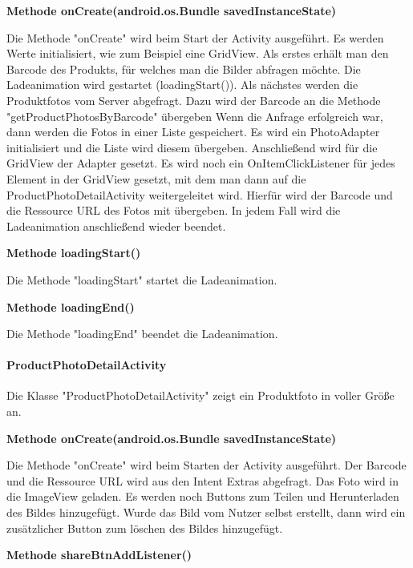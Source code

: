 \documentclass{scrartcl}
\begin{document}
\noindent\textbf{Methode onCreate(android.os.Bundle savedInstanceState)}

\noindent Die Methode "onCreate" wird beim Start der Activity ausgeführt. Es werden Werte initialisiert, wie zum Beispiel eine GridView. Als erstes erhält man den Barcode des Produkts, für welches man die Bilder abfragen möchte. Die Ladeanimation wird gestartet (loadingStart()). Als nächstes werden die Produktfotos vom Server abgefragt. Dazu wird der Barcode an die Methode "getProductPhotosByBarcode" übergeben Wenn die Anfrage erfolgreich war, dann werden die Fotos in einer Liste gespeichert. Es wird ein PhotoAdapter initialisiert und die Liste wird diesem übergeben. Anschließend wird für die GridView der Adapter gesetzt. Es wird noch ein OnItemClickListener für jedes Element in der GridView gesetzt, mit dem man dann auf die ProductPhotoDetailActivity weitergeleitet wird. Hierfür wird der Barcode und die Ressource URL des Fotos mit übergeben. In jedem Fall wird die Ladeanimation anschließend wieder beendet. \newline 

\noindent\textbf{Methode loadingStart()}

\noindent Die Methode "loadingStart" startet die Ladeanimation. \newline

\noindent\textbf{Methode loadingEnd()}

\noindent Die Methode "loadingEnd" beendet die Ladeanimation. \newline

\paragraph{ProductPhotoDetailActivity} 
Die Klasse "ProductPhotoDetailActivity" zeigt ein Produktfoto in voller Größe an. \newline 

\noindent\textbf{Methode onCreate(android.os.Bundle savedInstanceState)}

\noindent Die Methode "onCreate" wird beim Starten der Activity ausgeführt. Der Barcode und die Ressource URL wird aus den Intent Extras abgefragt. Das Foto wird in die ImageView geladen. Es werden noch Buttons zum Teilen und Herunterladen des Bildes hinzugefügt. Wurde das Bild vom Nutzer selbst erstellt, dann wird ein zusätzlicher Button zum löschen des Bildes hinzugefügt. \newline

\noindent\textbf{Methode shareBtnAddListener()}
\end{document}
